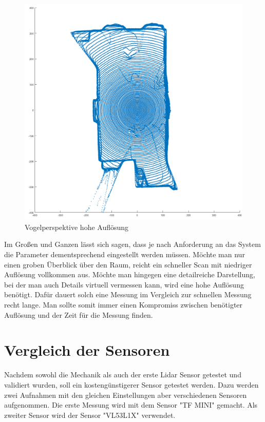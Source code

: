 \begin{figure}[htb]
\begin{minipage}[t]{0.45\linewidth}
		\includegraphics[width=1.2\linewidth]{images/Validierung/Aufloesungen/hoch_vogel.png}
		\caption{Vogelperspektive hohe Auflösung}
		\label{vogel hoheAuflösung}
	\end{minipage}
\end{figure}


Im Großen und Ganzen lässt sich sagen, dass je nach Anforderung an das System die Parameter dementsprechend eingestellt werden müssen. Möchte man nur einen groben Überblick über den Raum, reicht ein schneller Scan mit niedriger Auflösung vollkommen aus. Möchte man hingegen eine detailreiche Darstellung, bei der man auch Details virtuell vermessen kann, wird eine hohe Auflösung benötigt. Dafür dauert solch eine Messung im Vergleich zur schnellen Messung recht lange.
Man sollte somit immer einen Kompromiss zwischen benötigter Auflösung und der Zeit für die Messung finden.



\section{Vergleich der Sensoren}

Nachdem sowohl die Mechanik als auch der erste Lidar Sensor getestet und validiert wurden, soll ein kostengünstigerer Sensor getestet werden. Dazu werden zwei Aufnahmen mit den gleichen Einstellungen aber verschiedenen Sensoren aufgenommen. Die erste Messung wird mit dem Sensor "TF MINI" gemacht. Als zweiter Sensor wird der Sensor "VL53L1X" verwendet.

